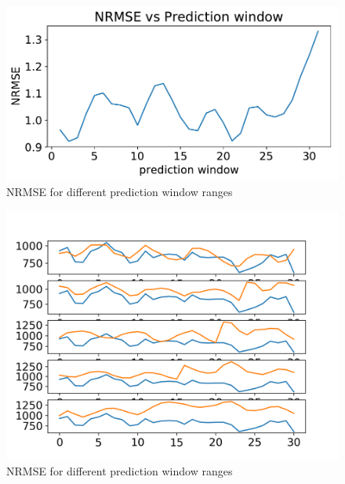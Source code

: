 	
  \begin{figure}[h]
     \centering
     \includegraphics[width=\textwidth]{./results/images/nrmsevspwrec}

      \caption{NRMSE for different prediction window ranges}\label{fig:nrmsevspw}
  \end{figure}
 
 \begin{figure}[h]
    \centering
    \includegraphics[width=\textwidth]{./results/images/realvspredicted}

     \caption{NRMSE for different prediction window ranges}\label{fig:realvspredicted}
 \end{figure}
 
